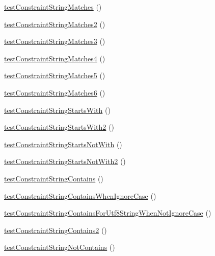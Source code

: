 \begin{DoxyCompactItemize}
\mbox{\hyperlink{class_framework___constraint_test_ae40e8290d78192973424e3e33bf357d8}{test\+Constraint\+String\+Matches}} ()
\item 
\mbox{\hyperlink{class_framework___constraint_test_acbe2474777004f516bd3dcc2663a1a8a}{test\+Constraint\+String\+Matches2}} ()
\item 
\mbox{\hyperlink{class_framework___constraint_test_ac9fcbd8d59734c73b168b77548a54b88}{test\+Constraint\+String\+Matches3}} ()
\item 
\mbox{\hyperlink{class_framework___constraint_test_a1baae9589dfeefe232cc67fb99a63546}{test\+Constraint\+String\+Matches4}} ()
\item 
\mbox{\hyperlink{class_framework___constraint_test_ad0c28ddbf2bdbcb8f6b5014e210c4b51}{test\+Constraint\+String\+Matches5}} ()
\item 
\mbox{\hyperlink{class_framework___constraint_test_a4d3cfaac18620b35db7a1f0e4ee0b6ac}{test\+Constraint\+String\+Matches6}} ()
\item 
\mbox{\hyperlink{class_framework___constraint_test_af9ff2c34a43d63e36cb67603ac7ecaa1}{test\+Constraint\+String\+Starts\+With}} ()
\item 
\mbox{\hyperlink{class_framework___constraint_test_aeeb7d77edf2c8a8e390286d24be9d8b2}{test\+Constraint\+String\+Starts\+With2}} ()
\item 
\mbox{\hyperlink{class_framework___constraint_test_a368e7f88ef71adb9d7cc0cfa0258d88e}{test\+Constraint\+String\+Starts\+Not\+With}} ()
\item 
\mbox{\hyperlink{class_framework___constraint_test_ae989e547afe3d95745c3e99f6a71f390}{test\+Constraint\+String\+Starts\+Not\+With2}} ()
\item 
\mbox{\hyperlink{class_framework___constraint_test_a9885b01d98f1dc6aabd18c63aa301e58}{test\+Constraint\+String\+Contains}} ()
\item 
\mbox{\hyperlink{class_framework___constraint_test_aea2257215c24d289cad0539bf430cd8e}{test\+Constraint\+String\+Contains\+When\+Ignore\+Case}} ()
\item 
\mbox{\hyperlink{class_framework___constraint_test_ad031f76984856bc8cb7ca71106a6140c}{test\+Constraint\+String\+Contains\+For\+Utf8\+String\+When\+Not\+Ignore\+Case}} ()
\item 
\mbox{\hyperlink{class_framework___constraint_test_ae6a9d5627958de4206b5e84c45653e73}{test\+Constraint\+String\+Contains2}} ()
\item 
\mbox{\hyperlink{class_framework___constraint_test_a73054fc9ff63d39293035b0d70fb7729}{test\+Constraint\+String\+Not\+Contains}} ()

\end{DoxyCompactItemize}
